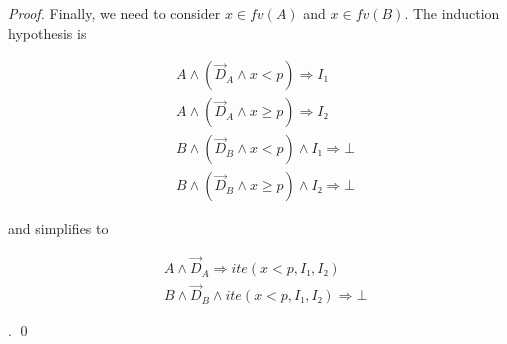 \begin{proof}
Finally, we need to consider $x ∈ fv(A)$ and $x ∈ fv(B)$.
The induction hypothesis is\\
\parbox{0.37\linewidth}{
\begin{eqnarray*}
& A ∧ (\vec D_A ∧ x < p) ⇒ I₁ \\
& A ∧ (\vec D_A ∧ x ≥ p) ⇒ I₂ \\
& B ∧ (\vec D_B ∧ x < p) ∧ I₁ ⇒ ⊥ \\
& B ∧ (\vec D_B ∧ x ≥ p) ∧ I₂ ⇒ ⊥
\end{eqnarray*}
}
and simplifies to
\parbox{0.41\linewidth}{
\begin{eqnarray*}
& A ∧ \vec D_A ⇒ ite(x < p, I₁, I₂)\\
& B ∧ \vec D_B ∧ ite(x < p, I₁, I₂) ⇒ ⊥
\end{eqnarray*}
}.
\qed
\end{proof}

